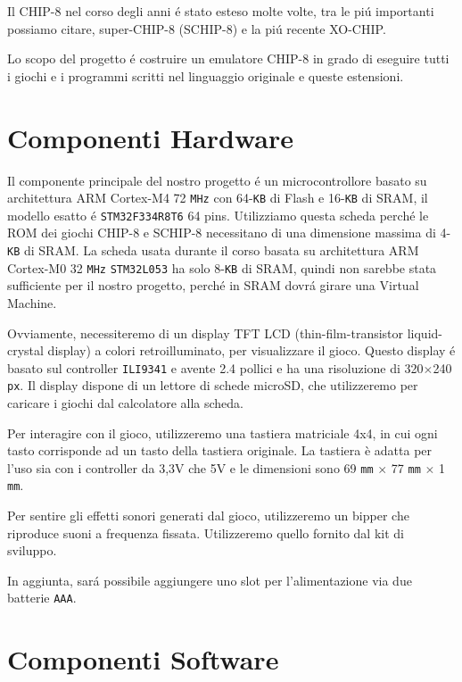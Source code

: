 \documentclass[a4paper]{article}
\begin{document}
Il CHIP-8 nel corso degli anni é stato esteso molte volte, tra le piú importanti possiamo citare, super-CHIP-8 (SCHIP-8) e la piú recente XO-CHIP.  

Lo scopo del progetto é costruire un emulatore CHIP-8 in grado di eseguire tutti i giochi e i programmi scritti nel linguaggio originale e queste estensioni. 


\section{Componenti Hardware}

Il componente principale del nostro progetto é un microcontrollore basato su architettura ARM Cortex-M4 72 \texttt{MHz} con 64-\texttt{KB} di Flash e 16-\texttt{KB} di SRAM, il  modello esatto é \texttt{STM32F334R8T6} 64 pins. Utilizziamo questa scheda perché le ROM dei giochi CHIP-8 e SCHIP-8 necessitano di una dimensione massima di 4-\texttt{KB} di SRAM. La scheda usata durante il corso basata su architettura ARM Cortex-M0 32 \texttt{MHz} \texttt{STM32L053} ha solo 8-\texttt{KB} di SRAM, quindi non sarebbe stata sufficiente per il nostro progetto, perché in SRAM dovrá girare una Virtual Machine. 

Ovviamente, necessiteremo di un display TFT LCD (thin-film-transistor liquid-crystal display) a colori retroilluminato, per visualizzare il gioco. Questo display é basato sul controller \texttt{ILI9341} e avente 2.4 pollici e ha una risoluzione di 320$\times$240 \texttt{px}. Il display dispone di un lettore di schede microSD, che utilizzeremo per caricare i giochi dal calcolatore alla scheda.

Per interagire con il gioco, utilizzeremo una tastiera matriciale 4x4, in cui ogni tasto corrisponde ad un tasto della tastiera originale. La tastiera è adatta per l'uso sia con i controller da 3,3V che 5V e le dimensioni sono 69 \texttt{mm} $\times$ 77 \texttt{mm} $\times$ 1 \texttt{mm}.  

Per sentire gli effetti sonori generati dal gioco, utilizzeremo un bipper che riproduce suoni a frequenza fissata. Utilizzeremo quello fornito dal kit di sviluppo.

In aggiunta, sará possibile aggiungere uno slot per l'alimentazione via due batterie \texttt{AAA}.

\section{Componenti Software}
\end{document}
